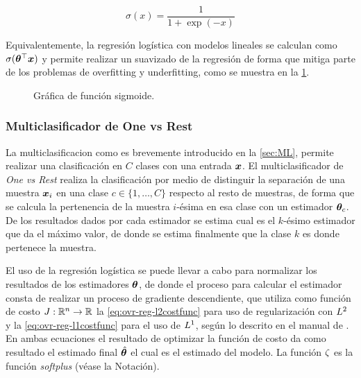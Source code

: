 \begin{equation} \label{eq:logits-formula}
  \sigma(x) = \frac{1} {1 + \exp(-x)}
\end{equation}

Equivalentemente, la regresión logística con modelos lineales se calculan como $\sigma({\bm{\theta}}^{\top} {\bm{x}})$ y permite realizar un suavizado de la regresión de forma que mitiga parte de los problemas de \gls{overfitting} y \gls{underfitting}, como se muestra en la \cref{fig:logits-example}.

\begin{figure}[H]
  \centering
\decoRule
\caption[Gráfica de función sigmoide]{Gráfica de función sigmoide.}
\label{fig:logits-example}
\end{figure}


\subsubsection{Multiclasificador de One vs Rest}
La multiclasificacion como es brevemente introducido en la \cref{sec:ML}, permite realizar una clasificación en $C$ clases con una entrada ${\bm{x}}$. El multiclasificador de \emph{One vs Rest} realiza la clasificación por medio de distinguir la separación de una muestra ${\bm{x}}_i$ en una clase $c \in \{1, \ldots, C\}$ respecto al resto de muestras, de forma que se calcula la pertenencia de la muestra $i$-\'esima en esa clase con un estimador ${\bm{\theta}}_c$. De los resultados dados por cada estimador se estima cual es el $k$-\'esimo estimador que da el máximo valor, de donde se estima finalmente que la clase $k$ es donde pertenece la muestra.

El uso de la regresión logística se puede llevar a cabo para normalizar los resultados de los estimadores ${\bm{\theta}}$, de donde el proceso para calcular el estimador consta de realizar un proceso de gradiente descendiente, que utiliza como función de costo $J: \mathbb{R}^n \rightarrow \mathbb{R}$ la \cref{eq:ovr-reg-l2costfunc} para uso de regularización con $L^2$ y la \cref{eq:ovr-reg-l1costfunc} para el uso de $L^1$, según lo descrito en el manual de \cite{sklearn_api}. En ambas ecuaciones el resultado de optimizar la función de costo da como resultado el estimado final $\hat{{\bm{\theta}}}$ el cual es el estimado del modelo. La función $\zeta$ es la función \emph{softplus} (véase la Notación).

